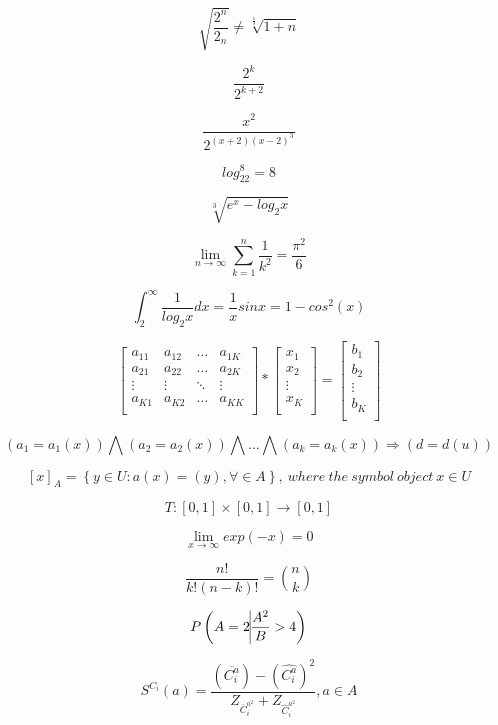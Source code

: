 \documentclass{document}
\begin{document}
$$ \sqrt{\frac{2^n}{2_n}} \neq \sqrt[\frac{1}{3}]{1+n} $$ 

$$ \frac{2^k}{2^{k+2}} $$ 

$$ \frac{x^2}{2^{\left(x+2\right)\left(x-2\right)^3}} $$ 

$$ log_22^8 = 8 $$ 

$$ \sqrt[3]{e^x-log_2x} $$ 

$$ \lim_{n \rightarrow \infty} \sum_{k=1}^n \frac{1}{k^2} = \frac{\pi^2}{6} $$ 

$$ \int_2^\infty \frac{1}{log_2x}dx = \frac{1}{x}sin x = 1 - cos^2\left(x\right) $$

$$ \left[ \begin{array}{cccc}
a_{11} & a_{12} & \ldots & a_{1K} \\
a_{21} & a_{22} & \ldots & a_{2K} \\
\vdots & \vdots & \ddots & \vdots \\
a_{K1} & a_{K2} & \ldots & a_{KK} \\
\end{array} \right] *
\left[ \begin{array}{c}
x_{1} \\
x_{2} \\
\vdots \\
x_{K} \\
\end{array} \right] =
\left[ \begin{array}{c}
b_{1} \\
b_{2} \\
\vdots \\
b_{K} \\
\end{array} \right]$$ 

$$ \left(a_1 = a_1\left(x\right)\right) 
\bigwedge 
\left(a_2 = a_2\left(x\right)\right) 
\bigwedge \ldots \bigwedge
\left(a_k = a_k\left(x\right)\right)
\Rightarrow
\left(d = d\left(u\right)\right) $$ 

$$ \left[x\right]_A = \left\lbrace y \in U : a \left(x\right) = \left(y\right), \forall \in A \right\rbrace
,\:where\:the\:symbol\:object\:x \in U $$ 

$$ T : \left[0,1\right] \times \left[0,1\right] \rightarrow \left[0,1\right] $$ 

$$ \lim_{x\rightarrow\infty} exp \left(-x\right) = 0 $$

$$ \frac{n!}{k!\left(n - k\right)!} = {n \choose k} $$ 

$$ P\left( A = 2 \vline \frac{A^2}{B} > 4 \right) $$ 

$$ S^{C_i}\left(a\right) = \frac{\left(\overline{C_i^a}\right) - \left( \hat{C_i^a} \right)^2}{Z_{\overline{C}_i^{a^2}} + Z_{\hat{C}_i^{a^2}}}, a \in A $$
\end{document}
